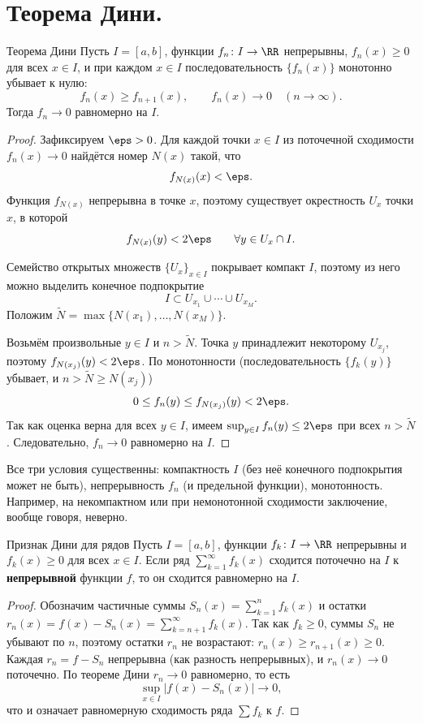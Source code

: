 
\section{Теорема Дини.}

\begin{Theorem}{Теорема Дини}{}
	Пусть $I = [a, b]$, функции $f_n \colon I \to \RR$ непрерывны, $f_n(x) \ge 0$ для всех $x \in I$, и при каждом $x \in I$ последовательность $\{f_n(x)\}$ монотонно убывает к нулю:
	\[
	f_n(x) \ge f_{n+1}(x), \qquad f_n(x) \to 0 \quad (n \to \infty).
	\]
	Тогда $f_n \to 0$ равномерно на $I$.
\end{Theorem}

\begin{proof}
	Зафиксируем $\eps > 0$. Для каждой точки $x \in I$ из поточечной сходимости $f_n(x) \to 0$ найдётся номер $N(x)$ такой, что
	\[
	f_{N(x)}(x) < \eps.
	\]
	Функция $f_{N(x)}$ непрерывна в точке $x$, поэтому существует окрестность $U_x$ точки $x$, в которой
	\[
	f_{N(x)}(y) < 2\eps \qquad \forall y \in U_x \cap I.
	\]

	Семейство открытых множеств $\{U_x\}_{x \in I}$ покрывает компакт $I$, поэтому из него можно выделить конечное подпокрытие
	\[
	I \subset U_{x_1} \cup \cdots \cup U_{x_M}.
	\]
	Положим $\widetilde{N} = \max\{N(x_1), \ldots, N(x_M)\}$.

	Возьмём произвольные $y \in I$ и $n > \widetilde{N}$. Точка $y$ принадлежит некоторому $U_{x_j}$, поэтому $f_{N(x_j)}(y) < 2\eps$. По монотонности (последовательность $\{f_k(y)\}$ убывает, и $n > \widetilde{N} \ge N(x_j)$)
	\[
	0 \le f_n(y) \le f_{N(x_j)}(y) < 2\eps.
	\]
	Так как оценка верна для всех $y \in I$, имеем $\sup_{y \in I} f_n(y) \le 2\eps$ при всех $n > \widetilde{N}$. Следовательно, $f_n \to 0$ равномерно на $I$.
\end{proof}

\begin{Remark}{}{}
	Все три условия существенны: компактность $I$ (без неё конечного подпокрытия может не быть), непрерывность $f_n$ (и предельной функции), монотонность. Например, на некомпактном или при немонотонной сходимости заключение, вообще говоря, неверно.
\end{Remark}

\begin{Corollary}{Признак Дини для рядов}{}
	Пусть $I = [a, b]$, функции $f_k \colon I \to \RR$ непрерывны и $f_k(x) \ge 0$ для всех $x \in I$. Если ряд $\sum_{k=1}^{\infty} f_k(x)$ сходится поточечно на $I$ к \textbf{непрерывной} функции $f$, то он сходится равномерно на $I$.
\end{Corollary}

\begin{proof}
	Обозначим частичные суммы $S_n(x) = \sum_{k=1}^{n} f_k(x)$ и остатки $r_n(x) = f(x) - S_n(x) = \sum_{k=n+1}^{\infty} f_k(x)$. Так как $f_k \ge 0$, суммы $S_n$ не убывают по $n$, поэтому остатки $r_n$ не возрастают: $r_n(x) \ge r_{n+1}(x) \ge 0$. Каждая $r_n = f - S_n$ непрерывна (как разность непрерывных), и $r_n(x) \to 0$ поточечно. По теореме Дини $r_n \to 0$ равномерно, то есть
	\[
	\sup_{x \in I} |f(x) - S_n(x)| \to 0,
	\]
	что и означает равномерную сходимость ряда $\sum f_k$ к $f$.
\end{proof}
